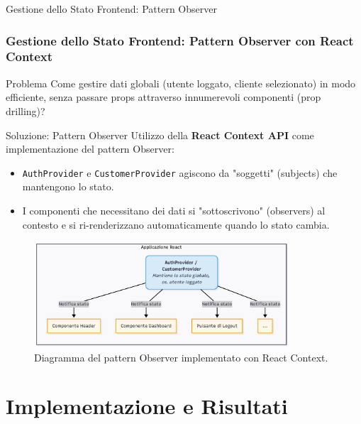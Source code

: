 \documentclass[8pt]{beamer}
\begin{document}
\begin{frame}{Gestione dello Stato Frontend: Pattern Observer}
  \frametitle{Gestione dello Stato Frontend: Pattern Observer con React Context}

  \begin{alertblock}{Problema}
    Come gestire dati globali (utente loggato, cliente selezionato) in modo efficiente, senza passare props attraverso innumerevoli componenti (prop drilling)?
  \end{alertblock}

  \begin{block}{Soluzione: Pattern Observer}
    Utilizzo della \textbf{React Context API} come implementazione del pattern Observer:
    \begin{itemize}
      \item \texttt{AuthProvider} e \texttt{CustomerProvider} agiscono da "soggetti" (subjects) che mantengono lo stato.
      \item I componenti che necessitano dei dati si "sottoscrivono" (observers) al contesto e si ri-renderizzano automaticamente quando lo stato cambia.
    \end{itemize}
  \end{block}

  \vfill %

  \begin{figure}
    \centering
    \includegraphics[width=0.85\textwidth]{figures/observer.png}
    \caption{Diagramma del pattern Observer implementato con React Context.}
  \end{figure}

\end{frame}
\section{Implementazione e Risultati}
\end{document}
